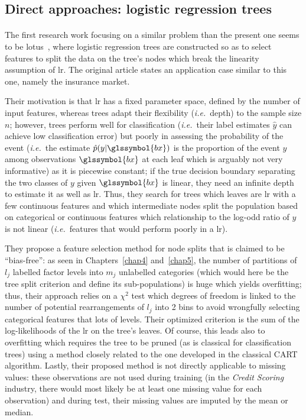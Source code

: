 \subsection{Direct approaches: logistic regression trees} \label{subsec:sup_gen}

\paragraph{}

The first research work focusing on a similar problem than the present one seems to be \gls{lotus}~\cite{chan2004lotus}, where logistic regression trees are constructed so as to select features to split the data on the tree's nodes which break the linearity assumption of \gls{lr}. The original article states an application case similar to this one, namely the insurance market.

Their motivation is that \gls{lr} has a fixed parameter space, defined by the number of input features, whereas trees adapt their flexibility (\textit{i.e.}\ depth) to the sample size $n$; however, trees perform well for classification (\textit{i.e.}\ their label estimates $\hat{y}$ can achieve low classification error) but poorly in assessing the probability of the event (\textit{i.e.}\ the estimate $\hat{p}(y | \glssymbol{bx})$ is the proportion of the event $y$ among observations $\glssymbol{bx}$ at each leaf which is arguably not very informative) as it is piecewise constant; if the true decision boundary separating the two classes of $y$ given $\glssymbol{bx}$ is linear, they need an infinite depth to estimate it as well as \gls{lr}. Thus, they search for trees which leaves are \gls{lr} with a few continuous features and which intermediate nodes split the population based on categorical or continuous features which relationship to the log-odd ratio of $y$ is not linear (\textit{i.e.}\ features that would perform poorly in a \gls{lr}).

They propose a feature selection method for node splits that is claimed to be ``bias-free'': as seen in Chapters~\ref{chap4} and~\ref{chap5}, the number of partitions of $l_j$ labelled factor levels into $m_j$ unlabelled categories (which would here be the tree split criterion and define its sub-populations) is huge which yields overfitting; thus, their approach relies on a $\chi^2$ test which degrees of freedom is linked to the number of potential rearrangements of $l_j$ into 2 bins to avoid wrongfully selecting categorical features that lots of levels. Their optimized criterion is the sum of the log-likelihoods of the \gls{lr} on the tree's leaves. Of course, this leads also to overfitting which requires the tree to be pruned (as is classical for classification trees) using a method closely related to the one developed in the classical CART~\cite{cart84} algorithm. Lastly, their proposed method is not directly applicable to missing values: these observations are not used during training (in the \textit{Credit Scoring} industry, there would most likely be at least one missing value for each observation) and during test, their missing values are imputed by the mean or median.

